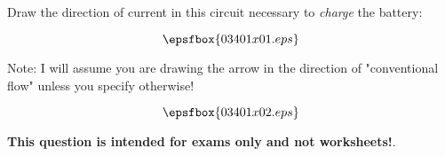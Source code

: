 

Draw the direction of current in this circuit necessary to {\it charge} the battery:

$$\epsfbox{03401x01.eps}$$

Note: I will assume you are drawing the arrow in the direction of "conventional flow" unless you specify otherwise!







$$\epsfbox{03401x02.eps}$$







{\bf This question is intended for exams only and not worksheets!}.



